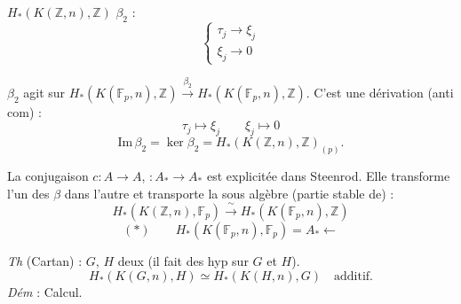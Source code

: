 \documentclass[11pt,a4paper]{article}
\begin{document}
$H_{\ast}(K(\mathbb{Z},n),\mathbb{Z})$ \quad $\beta_2$ :
\[
  \begin{cases} \tau_j \to \xi_j \\ \xi_j \to 0 \end{cases}
\]

$\beta_2$ agit sur $H_{\ast}(K(\mathbb{F}_p,n),\mathbb{Z}) \xrightarrow{\ \beta_2\ } H_{\ast}(K(\mathbb{F}_p,n),\mathbb{Z})$.
C'est une dérivation (anti com) :
\[
  \tau_j \longmapsto \xi_j \qquad \xi_j \longmapsto 0
\]
\[
  \mathrm{Im}\,\beta_2 = \ker\beta_2 = H_{\ast}(K(\mathbb{Z},n),\mathbb{Z})_{(p)} .
\]

La conjugaison $c : A \to A$, $: A_{\ast} \to A_{\ast}$ est explicitée dans Steenrod. Elle transforme l'un des $\beta$ dans l'autre et transporte la sous algèbre (partie stable de) :
\[
  H_{\ast}(K(\mathbb{Z},n),\mathbb{F}_p) \xrightarrow{\ \sim\ } H_{\ast}(K(\mathbb{F}_p,n),\mathbb{Z})
\]
\[
  (\ast) \qquad H_{\ast}(K(\mathbb{F}_p,n),\mathbb{F}_p) = A_{\ast} \longleftarrow
\]


\emph{Th} (Cartan) : $G$, $H$ deux    (il fait des hyp sur $G$ et $H$).
\[
  H_{\ast}(K(G,n),H) \simeq H_{\ast}(K(H,n),G) \quad \text{additif.}
\]
\emph{Dém} : Calcul.
\end{document}
